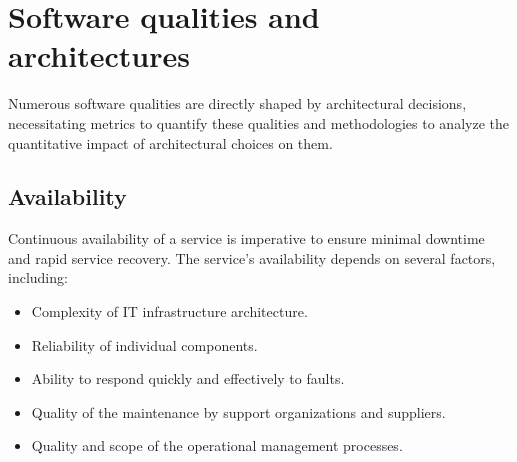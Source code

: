 \section{Software qualities and architectures}

Numerous software qualities are directly shaped by architectural decisions, necessitating metrics to quantify these qualities and methodologies to analyze the quantitative impact of architectural choices on them.

\subsection*{Availability}
Continuous availability of a service is imperative to ensure minimal downtime and rapid service recovery.
The service's availability depends on several factors, including:
\begin{itemize}
    \item Complexity of IT infrastructure architecture.
    \item Reliability of individual components.
    \item Ability to respond quickly and effectively to faults.
    \item Quality of the maintenance by support organizations and suppliers.
    \item Quality and scope of the operational management processes.
\end{itemize}

